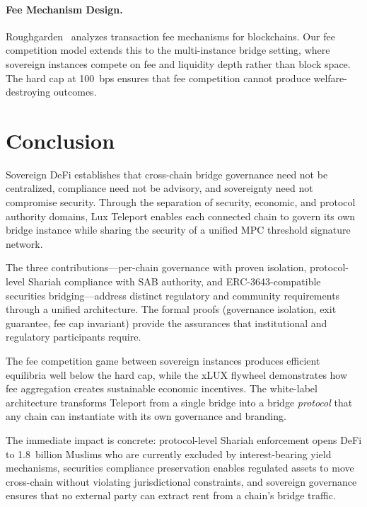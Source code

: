 \documentclass[11pt,twocolumn]{article}
\theoremstyle{definition}
\begin{document}
\paragraph{Fee Mechanism Design.}
Roughgarden~\cite{roughgarden2021} analyzes transaction fee mechanisms for blockchains. Our fee competition model extends this to the multi-instance bridge setting, where sovereign instances compete on fee and liquidity depth rather than block space. The hard cap at 100~bps ensures that fee competition cannot produce welfare-destroying outcomes.

\section{Conclusion}
\label{sec:conclusion}

Sovereign DeFi establishes that cross-chain bridge governance need not be centralized, compliance need not be advisory, and sovereignty need not compromise security. Through the separation of security, economic, and protocol authority domains, Lux Teleport enables each connected chain to govern its own bridge instance while sharing the security of a unified MPC threshold signature network.

The three contributions---per-chain governance with proven isolation, protocol-level Shariah compliance with SAB authority, and ERC-3643-compatible securities bridging---address distinct regulatory and community requirements through a unified architecture. The formal proofs (governance isolation, exit guarantee, fee cap invariant) provide the assurances that institutional and regulatory participants require.

The fee competition game between sovereign instances produces efficient equilibria well below the hard cap, while the xLUX flywheel demonstrates how fee aggregation creates sustainable economic incentives. The white-label architecture transforms Teleport from a single bridge into a bridge \emph{protocol} that any chain can instantiate with its own governance and branding.

The immediate impact is concrete: protocol-level Shariah enforcement opens DeFi to 1.8~billion Muslims who are currently excluded by interest-bearing yield mechanisms, securities compliance preservation enables regulated assets to move cross-chain without violating jurisdictional constraints, and sovereign governance ensures that no external party can extract rent from a chain's bridge traffic.
\end{document}
